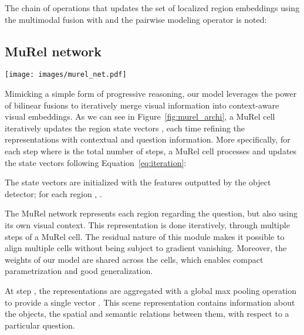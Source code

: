 \documentclass[10pt,twocolumn,letterpaper]{article}
\begin{document}
The chain of operations that updates the set of localized region embeddings  using the multimodal fusion with  and the pairwise modeling operator is noted:


\subsection{MuRel network}
\label{sub:murelnet}
\begin{figure*}
    \centering
    \texttt{[image: images/murel\_net.pdf]}
    \caption{\label{fig:murel_archi} \textbf{MuRel network.} The MuRel network merges the question embedding  into spatially-grounded visual representations  by iterating through a single MuRel cell. This module takes as input a set of localized vectors  and updates their representation using a multimodal fusion component. Moreover, it models all the possible pairwise relations between regions by combining spatial and semantic information. To construct the importance map at step , we count the number of time each region provides the maximal value of  (over the 2048 dimensions).}
\end{figure*}


Mimicking a simple form of progressive reasoning, our model leverages the power of bilinear fusions to iteratively merge visual information into context-aware visual embeddings.
As we can see in Figure~\ref{fig:murel_archi}, a MuRel cell iteratively updates the region state vectors , each time refining the representations with contextual and question information. More specifically, for each step  where  is the total number of steps, a MuRel cell processes and updates the state vectors following Equation~\eqref{eq:iteration}:



The state vectors are initialized with the features outputted by the object detector; for each region ,  . 

The MuRel network represents each region regarding the question, but also using its own visual context. This representation is done iteratively, through multiple steps of a MuRel cell. 
The residual nature of this module makes it possible to align multiple cells without being subject to gradient vanishing. 
Moreover, the weights of our model are shared across the cells, which enables compact parametrization and good generalization.

At step , the representations  are aggregated with a global max pooling operation to provide a single vector . This scene representation contains information about the objects, the spatial and semantic relations between them, with respect to a particular question.
\end{document}
